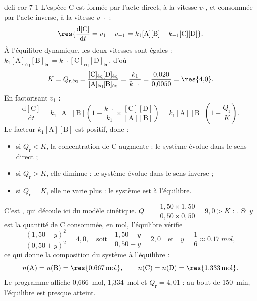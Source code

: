 \begin{blocEdition}{defi-cor-7-1}
L'espèce C est formée par l'acte direct, à la vitesse $v_1$, et consommée par l'acte inverse, à la vitesse $v_{-1}$ :
\[\res{\frac{\mathrm{d}[\mathrm{C}]}{\mathrm{d}t}=v_1-v_{-1}=k_1[\mathrm{A}][\mathrm{B}]-k_{-1}[\mathrm{C}][\mathrm{D}]}.\]
À l'équilibre dynamique, les deux vitesses sont égales : $k_1[\mathrm{A}]_\text{éq}[\mathrm{B}]_\text{éq}=k_{-1}[\mathrm{C}]_\text{éq}[\mathrm{D}]_\text{éq}$,
d'où
\[K=Q_{\mathrm{r},\text{éq}}=\frac{[\mathrm{C}]_\text{éq}[\mathrm{D}]_\text{éq}}{[\mathrm{A}]_\text{éq}[\mathrm{B}]_\text{éq}}=\frac{k_1}{k_{-1}}=\frac{0{,}020}{0{,}0050}=\res{4{,}0}.\]
En factorisant $v_1$ :
\[\frac{\mathrm{d}[\mathrm{C}]}{\mathrm{d}t}=k_1[\mathrm{A}][\mathrm{B}]\left(1-\frac{k_{-1}}{k_1}\times\frac{[\mathrm{C}][\mathrm{D}]}{[\mathrm{A}][\mathrm{B}]}\right)
=k_1[\mathrm{A}][\mathrm{B}]\left(1-\frac{Q_\mathrm{r}}{K}\right).\]
Le facteur $k_1[\mathrm{A}][\mathrm{B}]$ est positif, donc :
\begin{itemize}[leftmargin=1.4em,itemsep=0.1em]
\item si $Q_\mathrm{r}<K$, la concentration de C augmente : le système évolue dans le sens direct ;
\item si $Q_\mathrm{r}>K$, elle diminue : le système évolue dans le sens inverse ;
\item si $Q_\mathrm{r}=K$, elle ne varie plus : le système est à l'équilibre.
\end{itemize}
C'est , qui découle ici du modèle cinétique.
$Q_{\mathrm{r},\mathrm{i}}=\dfrac{1{,}50\times1{,}50}{0{,}50\times0{,}50}=9{,}0>K$ : .
Si $y$ est la quantité de C consommée, en mol, l'équilibre vérifie
\[\frac{(1{,}50-y)^2}{(0{,}50+y)^2}=4{,}0,\quad\text{soit}\quad\frac{1{,}50-y}{0{,}50+y}=2{,}0\quad\text{et}\quad
y=\frac16\approx\qty{0,17}{mol},\]
ce qui donne la composition du système à l'équilibre :
\[n(\mathrm{A})=n(\mathrm{B})=\res{\qty{0,667}{mol}},\qquad n(\mathrm{C})=n(\mathrm{D})=\res{\qty{1,333}{mol}}.\]
Le programme affiche 0,666~mol, 1,334~mol et $Q_\mathrm{r}=4{,}01$ : au bout de 150~min, l'équilibre est presque atteint.
\end{blocEdition}


